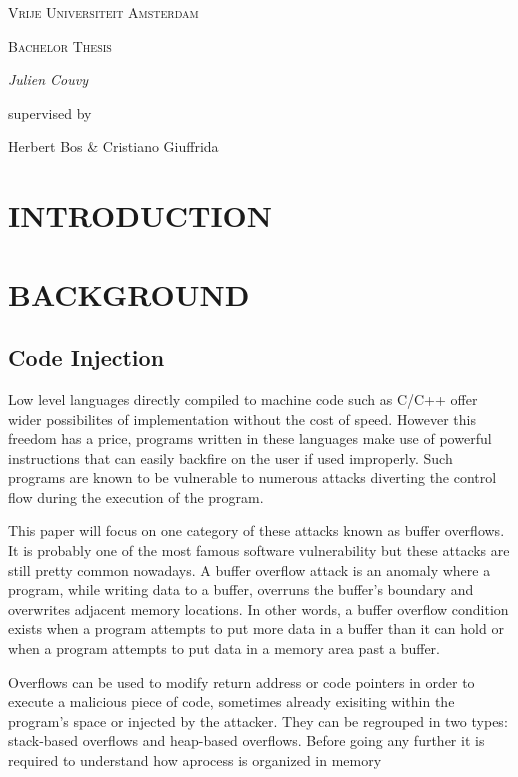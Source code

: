 \documentclass[10pt,twocolumn]{article}
\begin{document}
\begin{titlepage}
	\centering	
	{\scshape\LARGE Vrije Universiteit Amsterdam\par}
	\vspace{1cm}
	{\scshape\Large Bachelor Thesis\par}
	\vspace{1.5cm}
	{\huge\bfseries <INSERT TITLE>\par}
	\vspace{2cm}
	{\Large\itshape Julien Couvy\par}
	\vfill
	supervised by\par
	Herbert Bos \& Cristiano Giuffrida
	\vfill
\end{titlepage}

\begin{abstract}
	\textbf{
		\lipsum[1]
	}
\end{abstract}

\section{INTRODUCTION}
\lipsum[1-2]
\section{BACKGROUND}
\subsection{Code Injection}
Low level languages directly compiled to machine code such as C/C++ offer wider possibilites of implementation without the cost of speed. However this freedom has a price, programs written in these languages make use of powerful instructions that can easily backfire on the user if used improperly. Such programs are known to be vulnerable to numerous attacks diverting the control flow during the execution of the program.

This paper will focus on one category of these attacks known as buffer overflows. It is probably one of the most famous software vulnerability but these attacks are still pretty common nowadays. A buffer overflow attack is an anomaly where a program, while writing data to a buffer, overruns the buffer's boundary and overwrites adjacent memory locations. In other words, a buffer overflow condition exists when a program attempts to put more data in a buffer than it can hold or when a program attempts to put data in a memory area past a buffer.

Overflows can be used to modify return address or code pointers in order to execute a malicious piece of code, sometimes already exisiting within the program's space or injected by the attacker. They can be regrouped in two types: stack-based overflows and heap-based overflows. Before going any further it is required to understand how aprocess is organized in memory
\end{document}
